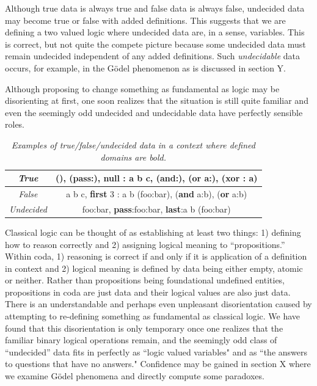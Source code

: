 \documentclass[11pt]{article}
\begin{document}
     Although true data is always true and false data is always false, undecided data may become true or false with added definitions.  
This suggests that we are defining a two valued logic where undecided data are, in a sense, variables.  This is correct, but 
not quite the compete picture because some undecided data must remain undecided independent of any added definitions. 
Such {\it undecidable} data occurs, for example, in the G\"{o}del phenomenon as is discussed in section Y. 

     Although proposing to change something as fundamental as logic may be disorienting at first, one soon realizes that the situation is still quite familiar 
and even the seemingly odd undecided and undecidable data have perfectly sensible roles.   
\begin{table}
\begin{center}
\begin{tabular}{ | c | c | }
\hline
 {\it True} & (), ({\bf pass}:), {\bf null} : a b c, ({\bf and}:), ({\bf or} a:), ({\bf xor} : a)  \\ 
 \hline
 {\it False} & a b c, {\bf first} 3 : a b (foo:bar), ({\bf and} a:b), ({\bf or} a:b)  \\  
 \hline
 {\it Undecided} & foo:bar, {\bf pass}:foo:bar, {\bf last}:a b (foo:bar)  \\   
 \hline
\end{tabular}
\end{center}
\caption{\label{ }{\it Examples of true/false/undecided data in a context where defined domains are bold.}}
\end{table}

Classical logic can be thought of as establishing at least two things: 1) defining how to reason correctly and 2) assigning logical meaning to ``propositions.''  
Within coda, 1) reasoning is correct if and only if it is application of a definition in context and 2) logical meaning is defined by data being either empty, atomic or neither.  
Rather than propositions being foundational undefined entities, propositions in coda are just data and their logical values are also just data.  
There is an understandable and perhaps even unpleasant disorientation caused by attempting to re-defining something 
as fundamental as classical logic.  We have found that this disorientation is only temporary once one realizes that the familiar binary logical operations remain,
 and the seemingly odd class of ``undecided'' data fits in perfectly as ``logic valued variables" and as ``the answers to questions that have no answers."  Confidence may 
 be gained in section X where we examine G\"{o}del phenomena and directly compute some paradoxes. 
\end{document}
